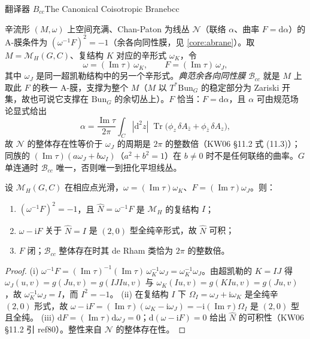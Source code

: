 \begin{centry}{翻译器 $B_{cc}$}{The Canonical Coisotropic Brane}{bcc}

\begin{definition}[典范余各向同性 A-膜]
辛流形 $(M,\omega)$ 上空间充满、Chan-Paton 为线丛 $\mathcal{N}$（联络 $\alpha$、曲率 $F=\mathrm{d}\alpha$）的 A-膜条件为 $(\omega^{-1}F)^{2}=-1$（余各向同性膜，见 \ref{core:abrane}）。取 $M=\mathcal{M}_H(G,C)$、复结构 $K$ 对应的辛形式 $\omega_{K}$，令
\[
\omega=(\operatorname{Im}\tau)\,\omega_{K},\qquad F=(\operatorname{Im}\tau)\,\omega_{J},
\]
其中 $\omega_{J}$ 是同一超凯勒结构中的另一个辛形式。\emph{典范余各向同性膜} $\mathcal{B}_{cc}$ 就是 $M$ 上取此 $F$ 的秩一 A-膜，支撑为整个 $M$（$M$ 以 $T^{*}\mathrm{Bun}_G$ 的稳定部分为 Zariski 开集，故也可说它支撑在 $\mathrm{Bun}_G$ 的余切丛上）。$F$ 恰当：$F=\mathrm{d}\alpha$，且 $\alpha$ 可由规范场论显式给出
\[
\alpha=\frac{\operatorname{Im}\tau}{2\pi}\int_{C}|\mathrm{d}^{2}z|\;\operatorname{Tr}\bigl(\phi_{z}\,\delta A_{\bar z}+\phi_{\bar z}\,\delta A_{z}\bigr),
\]
故 $\mathcal{N}$ 的整体存在性等价于 $\omega_{J}$ 的周期是 $2\pi$ 的整数倍（KW06 §11.2 式 (11.3)）；同族的 $(\operatorname{Im}\tau)(a\omega_{J}+b\omega_{I})$（$a^{2}+b^{2}=1$）在 $b\neq0$ 时不是任何联络的曲率。$G$ 单连通时 $\mathcal{B}_{cc}$ 唯一，否则唯一到扭化平坦线丛。
\end{definition}

\begin{theorem}
设 $\mathcal{M}_H(G,C)$ 在相应点光滑，$\omega=(\operatorname{Im}\tau)\omega_{K}$、$F=(\operatorname{Im}\tau)\omega_{J}$。则：
\begin{enumerate}[label=(\roman*)]
\item $(\omega^{-1}F)^{2}=-1$，且 $\hat{N}=\omega^{-1}F$ 是 $\mathcal{M}_H$ 的复结构 $I$；
\item $\omega-\mathrm{i}F$ 关于 $\hat{N}=I$ 是 $(2,0)$ 型全纯辛形式，故 $\hat{N}$ 可积；
\item $F$ 闭；$\mathcal{B}_{cc}$ 整体存在时其 de Rham 类恰为 $2\pi$ 的整数倍。
\end{enumerate}
\end{theorem}
\begin{proof}
(i) $\omega^{-1}F=(\operatorname{Im}\tau)^{-1}(\operatorname{Im}\tau)\,\omega_{K}^{-1}\omega_{J}=\omega_{K}^{-1}\omega_{J}$。由超凯勒的 $K=IJ$ 得 $\omega_{J}(u,v)=g(Ju,v)=g(IJIu,v)$ 与 $\omega_{K}(Iu,v)=g(KIu,v)=g(Ju,v)$，故 $\omega_{K}^{-1}\omega_{J}=I$，而 $I^{2}=-1$。
(ii) 在复结构 $I$ 下 $\Omega_{I}=\omega_{J}+\mathrm{i}\omega_{K}$ 是全纯辛 $(2,0)$ 形式，故 $\omega-\mathrm{i}F=(\operatorname{Im}\tau)(\omega_{K}-\mathrm{i}\omega_{J})=-\mathrm{i}(\operatorname{Im}\tau)\Omega_{I}$ 是 $(2,0)$ 型且全纯。
(iii) $\mathrm{d}F=(\operatorname{Im}\tau)\mathrm{d}\omega_{J}=0$；$\mathrm{d}(\omega-\mathrm{i}F)=0$ 给出 $\hat{N}$ 的可积性（KW06 §11.2 引 ref80）。整性来自 $\mathcal{N}$ 的整体存在性。
\end{proof}


\end{centry}
